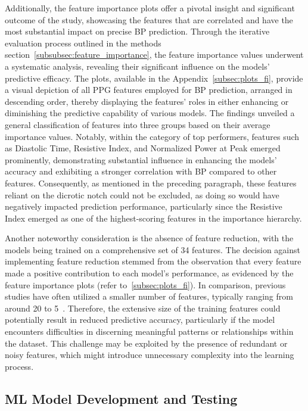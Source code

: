Additionally, the feature importance plots offer a pivotal insight and significant outcome of the study, showcasing the features that are correlated and have the most substantial impact on precise BP prediction.
Through the iterative evaluation process outlined in the methods section~\ref{subsubsec:feature_importance}, the feature importance values underwent a systematic analysis,
revealing their significant influence on the models' predictive efficacy.
The plots, available in the Appendix~\ref{subsec:plots_fi}, provide a visual depiction of all PPG features employed for BP prediction, arranged in descending order,
thereby displaying the features' roles in either enhancing or diminishing the predictive capability of various models.
The findings unveiled a general classification of features into three groups based on their average importance values.
Notably, within the category of top performers, features such as Diastolic Time, Resistive Index, and Normalized Power at Peak emerged prominently,
demonstrating substantial influence in enhancing the models' accuracy and exhibiting a stronger correlation with BP compared to other features.
Consequently, as mentioned in the preceding paragraph, these features reliant on the dicrotic notch could not be excluded, as doing so would have negatively impacted prediction performance,
particularly since the Resistive Index emerged as one of the highest-scoring features in the importance hierarchy.

Another noteworthy consideration is the absence of feature reduction, with the models being trained on a comprehensive set of 34 features.
The decision against implementing feature reduction stemmed from the observation that every feature made a positive contribution to each model's performance,
as evidenced by the feature importance plots (refer to~\ref{subsec:plots_fi}).
In comparison, previous studies have often utilized a smaller number of features, typically ranging from around 20 to 5~\cite{el-hajjDeepLearningModels2021, charltonAssessingHemodynamicsPhotoplethysmogram2022, yilmazNocturnalBloodPressure2023}.
Therefore, the extensive size of the training features could potentially result in reduced predictive accuracy,
particularly if the model encounters difficulties in discerning meaningful patterns or relationships within the dataset.
This challenge may be exploited by the presence of redundant or noisy features, which might introduce unnecessary complexity into the learning process.

\subsection{ML Model Development and Testing}
\label{subsec:ml-model-development-and-testing}

